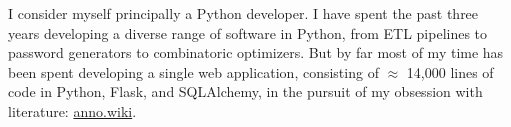 \documentclass[9pt]{developercv} %
\begin{document}
\vspace{0.5cm}



\begin{minipage}[t]{0.4\textwidth} %
	\vspace{-\baselineskip} %

    I consider myself principally a Python developer. I have spent the past
    three years developing a diverse range of software in Python, from ETL
    pipelines to password generators to combinatoric optimizers. But by far most
    of my time has been spent developing a single web application, consisting of
    $\approx$ 14,000 lines of code in Python, Flask, and SQLAlchemy, in the
    pursuit of my obsession with literature:
    {\href{https://github.com/malan88/icc}{anno.wiki}}.
\end{minipage}
\hfill %
\begin{minipage}[t]{0.5\textwidth} %
	\vspace{-\baselineskip} %
	\begin{barchart}{5.5}
	\end{barchart}
\end{minipage}

\begin{center}
\end{center}


\end{document}
